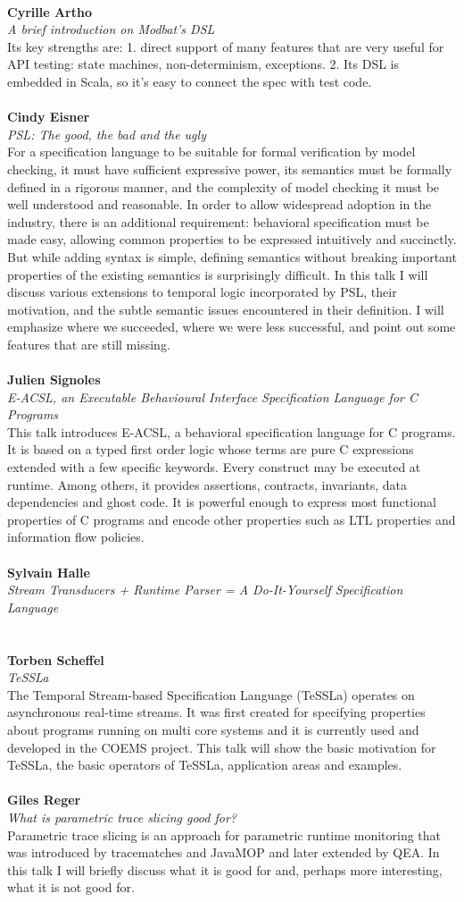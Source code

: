 \documentclass{article}
\newcommand{\talk}[3]{
\vspace{0.5em}~\\
\noindent
\textbf{#1}\\ 
\noindent\emph{#2}\\ 
\noindent#3\\
}
\begin{document}
\talk{Cyrille Artho}{A brief introduction on Modbat's DSL}
{Its key strengths are: 1. direct support of many features that are very useful for API testing: state machines, non-determinism, exceptions. 2. Its DSL is embedded in Scala, so it's easy to connect the spec with test code.}
\talk{Cindy Eisner}{PSL: The good, the bad and the ugly}{For a specification language to be suitable for formal verification by model checking, it must have sufficient expressive power, its semantics must be formally defined in a rigorous manner, and the complexity of model checking it must be well understood and reasonable. In order to allow widespread adoption in the industry, there is an additional requirement: behavioral specification must be made easy, allowing common properties to be expressed intuitively and succinctly. But while adding syntax is simple, defining semantics without breaking important properties of the existing semantics is surprisingly difficult. In this talk I will discuss various extensions to temporal logic incorporated by PSL, their motivation, and the subtle semantic issues encountered in their definition. I will emphasize where we succeeded, where we were less successful, and point out some features that are still missing.}
\talk{Julien Signoles}{E-ACSL, an Executable Behavioural Interface Specification Language for C Programs}{This talk introduces E-ACSL, a behavioral specification language for C programs. It is based on a typed first order logic whose terms are pure C expressions extended with a few specific keywords. Every construct may be executed at runtime. Among others, it provides assertions, contracts, invariants, data dependencies and ghost code. It is powerful enough to express most functional properties of C programs and encode other properties such as LTL properties and information flow policies.}
\talk{Sylvain Halle}{Stream Transducers + Runtime Parser = A Do-It-Yourself Specification Language}{}
\talk{Torben Scheffel}{TeSSLa}{The Temporal Stream-based Specification Language (TeSSLa) operates on asynchronous real-time streams. It was first created for specifying properties about programs running on multi core systems and it is currently used and developed in the COEMS project. This talk will show the basic motivation for TeSSLa, the basic operators of TeSSLa, application areas and examples.}
\talk{Giles Reger}{What is parametric trace slicing good for?}{Parametric trace slicing is an approach for parametric runtime monitoring that was introduced by tracematches and JavaMOP and later extended by QEA. In this talk I will briefly discuss what it is good for and, perhaps more interesting, what it is not good for.}
\end{document}
